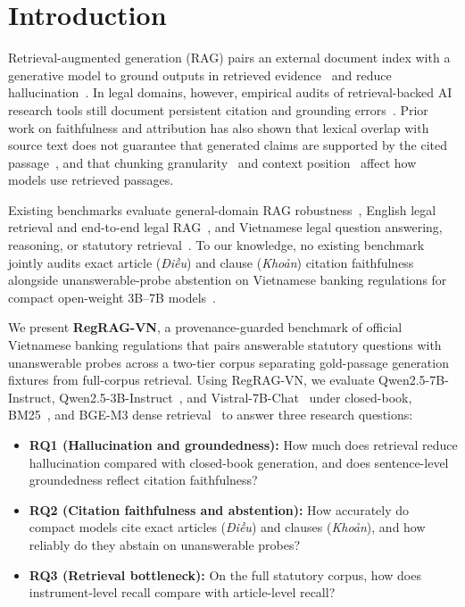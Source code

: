 \documentclass[conference,a4paper]{IEEEtran}
\begin{document}
\section{Introduction}
\label{sec:intro}

Retrieval-augmented generation (RAG) pairs an external document index with a generative model to ground outputs in retrieved evidence~\cite{lewis2020rag,gao2024ragsurvey} and reduce hallucination~\cite{ji2023hallucination}. In legal domains, however, empirical audits of retrieval-backed AI research tools still document persistent citation and grounding errors~\cite{magesh2025hallucinationfree}. Prior work on faithfulness and attribution has also shown that lexical overlap with source text does not guarantee that generated claims are supported by the cited passage~\cite{maynez2020faithfulness,rashkin2023attribution,bohnet2022attributed,min2023factscore}, and that chunking granularity~\cite{qin2025mixgranularity} and context position~\cite{liu2024lostmiddle} affect how models use retrieved passages.

Existing benchmarks evaluate general-domain RAG robustness~\cite{liu2024rgb,es2024ragas}, English legal retrieval and end-to-end legal RAG~\cite{pipitone2024legalbenchrag,butler2026legalragbench}, and Vietnamese legal question answering, reasoning, or statutory retrieval~\cite{nguyen2025vlqa,dong2025vlegalbench,nguyen2026vilegallm,nguyen2024vnlegalir}. To our knowledge, no existing benchmark jointly audits exact article (\emph{Điều}) and clause (\emph{Khoản}) citation faithfulness alongside unanswerable-probe abstention on Vietnamese banking regulations for compact open-weight 3B--7B models~\cite{yang2024qwen25,nguyen2023vistral}.

We present \textbf{RegRAG-VN}, a provenance-guarded benchmark of official Vietnamese banking regulations that pairs answerable statutory questions with unanswerable probes across a two-tier corpus separating gold-passage generation fixtures from full-corpus retrieval. Using RegRAG-VN, we evaluate Qwen2.5-7B-Instruct, Qwen2.5-3B-Instruct~\cite{yang2024qwen25}, and Vistral-7B-Chat~\cite{nguyen2023vistral} under closed-book, BM25~\cite{robertson2009bm25,rankbm25}, and BGE-M3 dense retrieval~\cite{chen2024m3} to answer three research questions:
\begin{itemize}
\item \textbf{RQ1 (Hallucination and groundedness):} How much does retrieval reduce hallucination compared with closed-book generation, and does sentence-level groundedness reflect citation faithfulness?
\item \textbf{RQ2 (Citation faithfulness and abstention):} How accurately do compact models cite exact articles (\emph{Điều}) and clauses (\emph{Khoản}), and how reliably do they abstain on unanswerable probes?
\item \textbf{RQ3 (Retrieval bottleneck):} On the full statutory corpus, how does instrument-level recall compare with article-level recall?
\end{itemize}
\end{document}
